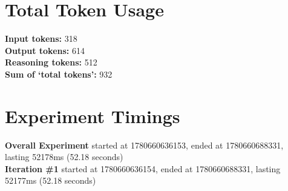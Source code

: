 \documentclass{article}
\begin{document}
\section*{Total Token Usage}
\textbf{Input tokens: }318
\\\textbf{Output tokens: }614
\\\textbf{Reasoning tokens: }512
\\\textbf{Sum of `total tokens': }932
\section*{Experiment Timings}
\textbf{Overall Experiment} started at 1780660636153, ended at 1780660688331, lasting 52178ms (52.18 seconds)
\\\textbf{Iteration \#1} started at 1780660636154, ended at 1780660688331, lasting 52177ms (52.18 seconds)
\end{document}
